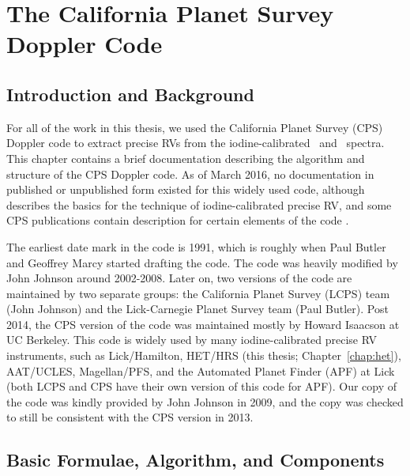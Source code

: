 \chapter{The California Planet Survey Doppler
  Code}\label{chap:doppler} 

\section{Introduction and Background}

For all of the work in this thesis, we used the California Planet
Survey (CPS) Doppler code to extract precise RVs from the
iodine-calibrated \het\ and \keck\ spectra. This chapter contains a
brief documentation describing the algorithm and structure of the CPS
Doppler code. As of March 2016, no documentation in published or
unpublished form existed for this widely used code, although
\cite{butler1996} describes the basics for the technique of
iodine-calibrated precise RV, and some CPS publications contain
description for certain elements of the code
\citep[e.g.,][]{2006ApJ...647..600J, 2009ApJ...696...75H,
2011ApJ...726...73H, 2011ApJS..197...26J}.

The earliest date mark in the code is 1991, which is roughly when Paul
Butler and Geoffrey Marcy started drafting the code. The code was
heavily modified by John Johnson around 2002-2008. Later on, two
versions of the code are maintained by two separate groups: the
California Planet Survey (LCPS) team (John Johnson) and the
Lick-Carnegie Planet Survey team (Paul Butler). Post 2014, the CPS
version of the code was maintained mostly by Howard Isaacson at UC
Berkeley. This code is widely used by many iodine-calibrated
precise RV instruments, such as Lick/Hamilton, HET/HRS (this thesis;
Chapter~\ref{chap:het}), AAT/UCLES, Magellan/PFS, and the Automated
Planet Finder (APF) at Lick (both LCPS and CPS have their own version
of this code for APF). Our copy of the code was kindly provided by
John Johnson in 2009, and the copy was checked to still be consistent
with the CPS version in 2013.


\section{Basic Formulae, Algorithm, and Components}

